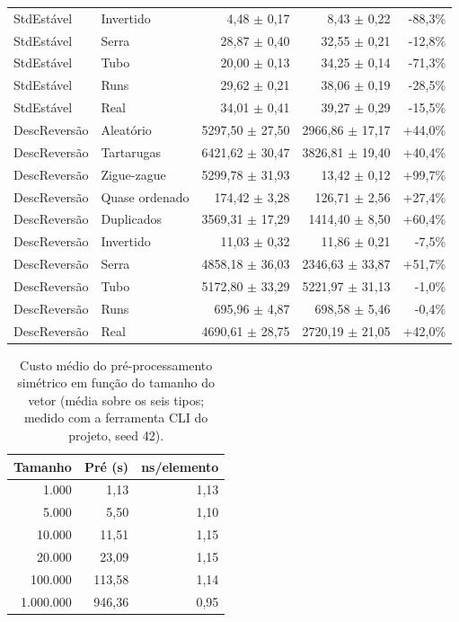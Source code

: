 \begin{table}[ht]
\begin{tabular}{llrrr}
StdEstável & Invertido & 4,48 $\pm$ 0,17 & 8,43 $\pm$ 0,22 & -88,3\% \\
StdEstável & Serra & 28,87 $\pm$ 0,40 & 32,55 $\pm$ 0,21 & -12,8\% \\
StdEstável & Tubo & 20,00 $\pm$ 0,13 & 34,25 $\pm$ 0,14 & -71,3\% \\
StdEstável & Runs & 29,62 $\pm$ 0,21 & 38,06 $\pm$ 0,19 & -28,5\% \\
StdEstável & Real & 34,01 $\pm$ 0,41 & 39,27 $\pm$ 0,29 & -15,5\% \\
DescReversão & Aleatório & 5297,50 $\pm$ 27,50 & 2966,86 $\pm$ 17,17 & +44,0\% \\
DescReversão & Tartarugas & 6421,62 $\pm$ 30,47 & 3826,81 $\pm$ 19,40 & +40,4\% \\
DescReversão & Zigue-zague & 5299,78 $\pm$ 31,93 & 13,42 $\pm$ 0,12 & +99,7\% \\
DescReversão & Quase ordenado & 174,42 $\pm$ 3,28 & 126,71 $\pm$ 2,56 & +27,4\% \\
DescReversão & Duplicados & 3569,31 $\pm$ 17,29 & 1414,40 $\pm$ 8,50 & +60,4\% \\
DescReversão & Invertido & 11,03 $\pm$ 0,32 & 11,86 $\pm$ 0,21 & -7,5\% \\
DescReversão & Serra & 4858,18 $\pm$ 36,03 & 2346,63 $\pm$ 33,87 & +51,7\% \\
DescReversão & Tubo & 5172,80 $\pm$ 33,29 & 5221,97 $\pm$ 31,13 & -1,0\% \\
DescReversão & Runs & 695,96 $\pm$ 4,87 & 698,58 $\pm$ 5,46 & -0,4\% \\
DescReversão & Real & 4690,61 $\pm$ 28,75 & 2720,19 $\pm$ 21,05 & +42,0\% \\
\hline
\end{tabular}
\end{table}
\begin{table}[ht]
\centering
\caption{Custo médio do pré-processamento simétrico em função do tamanho do vetor (média sobre os seis tipos; medido com a ferramenta CLI do projeto, seed 42).}
\label{tab:precusto}
\begin{tabular}{rrr}
\hline
\textbf{Tamanho} & \textbf{Pré (\textmu{}s)} & \textbf{ns/elemento} \\
\hline
1.000 & 1,13 & 1,13 \\
5.000 & 5,50 & 1,10 \\
10.000 & 11,51 & 1,15 \\
20.000 & 23,09 & 1,15 \\
100.000 & 113,58 & 1,14 \\
1.000.000 & 946,36 & 0,95 \\
\hline
\end{tabular}
\end{table}
